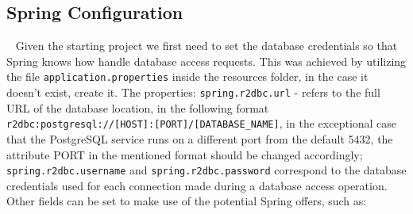 \subsection{Spring Configuration}~\label{ch:impl:sec:be:subsec:be-spring-config}
Given the starting project we first need to set the database credentials so that Spring knows how handle database access requests. This was achieved by utilizing the file \texttt{application.properties} inside the resources folder, in the case it doesn't exist, create it. The properties: \lstinline{spring.r2dbc.url} - refers to the full URL of the database location, in the following format \lstinline{r2dbc:postgresql://[HOST]:[PORT]/[DATABASE_NAME]}, in the exceptional case that the PostgreSQL service runs on a different port from the default 5432, the attribute PORT in the mentioned format should be changed accordingly; \lstinline{spring.r2dbc.username} and \lstinline{spring.r2dbc.password} correspond to the database credentials used for each connection made during a database access operation. Other fields can be set to make use of the potential Spring offers, such as:

